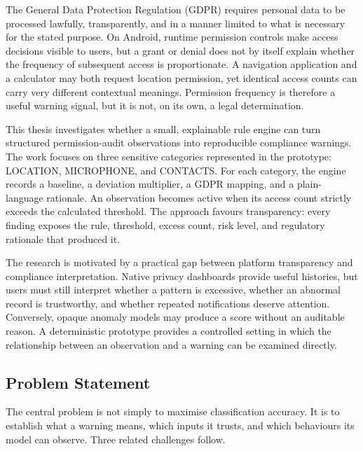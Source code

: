 The General Data Protection Regulation (GDPR) requires personal data to be processed lawfully, transparently, and in a manner limited to what is necessary for the stated purpose. On Android, runtime permission controls make access decisions visible to users, but a grant or denial does not by itself explain whether the frequency of subsequent access is proportionate. A navigation application and a calculator may both request location permission, yet identical access counts can carry very different contextual meanings. Permission frequency is therefore a useful warning signal, but it is not, on its own, a legal determination.

This thesis investigates whether a small, explainable rule engine can turn structured permission-audit observations into reproducible compliance warnings. The work focuses on three sensitive categories represented in the prototype: LOCATION, MICROPHONE, and CONTACTS. For each category, the engine records a baseline, a deviation multiplier, a GDPR mapping, and a plain-language rationale. An observation becomes active when its access count strictly exceeds the calculated threshold. The approach favours transparency: every finding exposes the rule, threshold, excess count, risk level, and regulatory rationale that produced it.

The research is motivated by a practical gap between platform transparency and compliance interpretation. Native privacy dashboards provide useful histories, but users must still interpret whether a pattern is excessive, whether an abnormal record is trustworthy, and whether repeated notifications deserve attention. Conversely, opaque anomaly models may produce a score without an auditable reason. A deterministic prototype provides a controlled setting in which the relationship between an observation and a warning can be examined directly.

\subsection{Problem Statement}

The central problem is not simply to maximise classification accuracy. It is to establish what a warning means, which inputs it trusts, and which behaviours its model can observe. Three related challenges follow.

